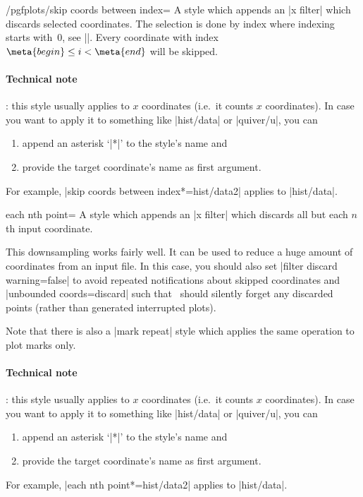 \begin{stylekey}{/pgfplots/skip coords between index=}
	A style which appends an |x filter| which discards selected coordinates. The selection is done by index where indexing starts with~$0$, see |\coordindex|. Every coordinate with index $\meta{begin} \le i < \meta{end}$ will be skipped.
\begin{codeexample}[]
\end{codeexample}

	\paragraph{Technical note}: this style usually applies to $x$ coordinates (i.e.\ it counts $x$ coordinates). In case you want to apply it to something like |hist/data| or |quiver/u|, you can 
	\begin{enumerate}
		\item append an asterisk `|*|' to the style's name and
		\item provide the target coordinate's name as first argument.
	\end{enumerate}
	For example, |skip coords between index*={hist/data}{2}| applies to |hist/data|.
\end{stylekey}

\begin{pgfplotskey}{each nth point=}
	A style which appends an |x filter| which discards all but each $n$th input coordinate.

	This downsampling works fairly well. It can be used to reduce a huge amount of coordinates from an input file. In this case, you should also set |filter discard warning=false| to avoid repeated notifications about skipped coordinates and |unbounded coords=discard| such that \PGFPlots\ should silently forget any discarded points (rather than generated interrupted plots).

	Note that there is also a |mark repeat| style which applies the same operation to plot marks only.

	\paragraph{Technical note}: this style usually applies to $x$ coordinates (i.e.\ it counts $x$ coordinates). In case you want to apply it to something like |hist/data| or |quiver/u|, you can 
	\begin{enumerate}
		\item append an asterisk `|*|' to the style's name and
		\item provide the target coordinate's name as first argument.
	\end{enumerate}
	For example, |each nth point*={hist/data}{2}| applies to |hist/data|.
\end{pgfplotskey}

